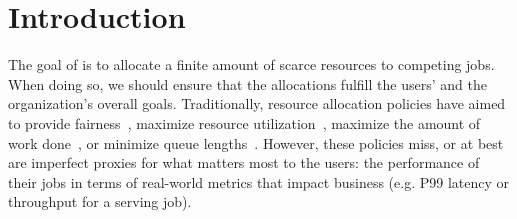 
\section{Introduction}
\label{sec:intro}




The goal of  is to allocate a finite amount of
scarce resources to competing jobs.
When doing so, we should ensure that the allocations fulfill the users' and the
organization's overall goals.
% 
Traditionally, resource allocation policies have aimed to
provide fairness~\cite{ghodsi2011dominant,demers1989analysis},
maximize resource utilization~\cite{xiao2018gandiva},
maximize the amount of work done~\cite{ghodsi2011dominant},
or
minimize queue lengths~\cite{racksched,sparrow}.
% 
However,
these policies miss, or at best are imperfect proxies for what matters most to the users:
the performance of their jobs in terms of real-world metrics that impact business
(e.g. P99 latency or throughput for a serving job).


\insertResUtilIllus

